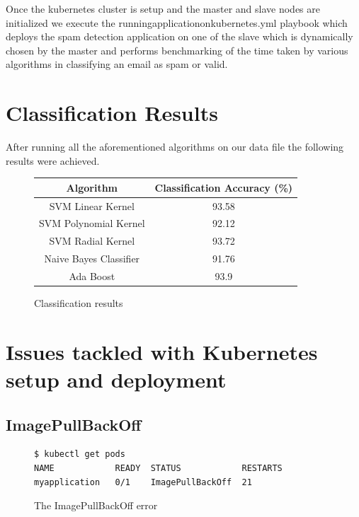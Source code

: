 \documentclass[9pt,twocolumn,twoside]{../../styles/osajnl}
\begin{document}
{\noindent
Once the kubernetes cluster is setup and the master and slave nodes
are initialized we execute the runningapplicationonkubernetes.yml
playbook which deploys the spam detection application on one of the
slave which is dynamically chosen by the master and performs
benchmarking of the time taken by various algorithms in classifying an
email as spam or valid.

\section{Classification Results}

After running all the aforementioned algorithms on our data file the
following results were achieved.

\begin{figure}[ht]
\begin{center}
 \begin{tabular}{|c | c|} 
 \hline
Algorithm  & Classification Accuracy (\%) \\ [0.5ex] 
 \hline\hline
    
SVM Linear Kernel & 93.58 \\
\hline

SVM Polynomial Kernel & 92.12 \\
\hline

SVM Radial Kernel & 93.72 \\[1ex]
\hline

Naive Bayes Classifier & 91.76 \\[1ex]

\hline
Ada Boost  & 93.9 \\[1ex]
\hline

\end{tabular}
\end{center}
  \caption{Classification results}
\end{figure}


\section{Issues tackled with Kubernetes setup and deployment}

\subsection{ImagePullBackOff}

\begin{figure}[H]
\begin{verbatim}
$ kubectl get pods
NAME            READY  STATUS            RESTARTS  
myapplication   0/1    ImagePullBackOff  21         
\end{verbatim}
\caption{The ImagePullBackOff error}
\vspace{-3mm}
\label{The ImagePullBackOff error}
\end{figure}

}
\end{document}
